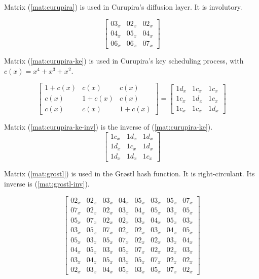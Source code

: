 Matrix (\ref{mat:curupira}) is used in Curupira's diffusion layer. It is involutory.

\begin{equation}\label{mat:curupira}
\begin{bmatrix}
03_x & 02_x & 02_x\\
04_x & 05_x & 04_x\\
06_x & 06_x & 07_x
\end{bmatrix}
\end{equation}

Matrix (\ref{mat:curupira-ke}) is used in Curupira's key scheduling process, with $c(x) = x^4 + x^3 + x^2$.

\begin{equation}\label{mat:curupira-ke}
\begin{bmatrix}
1+c(x) & c(x) & c(x)\\
c(x) & 1+c(x) & c(x)\\
c(x) & c(x) & 1+c(x)
\end{bmatrix}
=
\begin{bmatrix}
1d_x & 1c_x & 1c_x\\
1c_x & 1d_x & 1c_x\\
1c_x & 1c_x & 1d_x
\end{bmatrix}
\end{equation}

Matrix (\ref{mat:curupira-ke-inv}) is the inverse of (\ref{mat:curupira-ke}).
\begin{equation}\label{mat:curupira-ke-inv}
\begin{bmatrix}
1c_x & 1d_x & 1d_x\\
1d_x & 1c_x & 1d_x\\
1d_x & 1d_x & 1c_x
\end{bmatrix}
\end{equation}

Matrix (\ref{mat:grostl}) is used in the Gr{\o}stl hash function. It is right-circulant. Its inverse is (\ref{mat:grostl-inv}).

\begin{equation}\label{mat:grostl}
\begin{bmatrix}
02_x & 02_x & 03_x & 04_x & 05_x & 03_x & 05_x & 07_x\\
07_x & 02_x & 02_x & 03_x & 04_x & 05_x & 03_x & 05_x\\
05_x & 07_x & 02_x & 02_x & 03_x & 04_x & 05_x & 03_x\\
03_x & 05_x & 07_x & 02_x & 02_x & 03_x & 04_x & 05_x\\
05_x & 03_x & 05_x & 07_x & 02_x & 02_x & 03_x & 04_x\\
04_x & 05_x & 03_x & 05_x & 07_x & 02_x & 02_x & 03_x\\
03_x & 04_x & 05_x & 03_x & 05_x & 07_x & 02_x & 02_x\\
02_x & 03_x & 04_x & 05_x & 03_x & 05_x & 07_x & 02_x
\end{bmatrix}
\end{equation}

